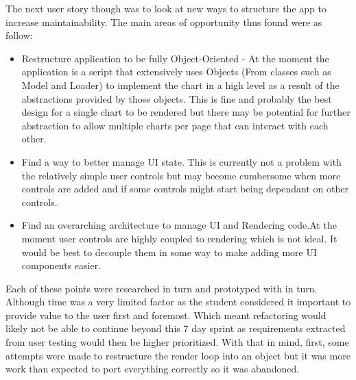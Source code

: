 The next user story though was to look at new ways to structure the app to increase maintainability. The main areas of opportunity thus found were as follow:
\begin{itemize}
    \item Restructure application to be fully Object-Oriented - At the moment the application is a script that extensively uses Objects (From classes such as Model and Loader) to implement the chart in a high level as a result of the abstractions provided by those objects. This is fine and probably the best design for a single chart to be rendered but there may be potential for further abstraction to allow multiple charts per page that can interact with each other.
    \item Find a way to better manage UI state. This is currently not a problem with the relatively simple user controls but may become cumbersome when more controls are added and if some controls might start being dependant on other controls.
    \item Find an overarching architecture to manage UI and Rendering code.At the moment user controls are highly coupled to rendering which is not ideal. It would be best to decouple them in some way to make adding more UI components easier.
\end{itemize}

Each of these points were researched in turn and prototyped with in turn. Although time was a very limited factor as the student considered it important to provide value to the user first and foremost. Which meant refactoring would likely not be able to continue beyond this 7 day sprint as requirements extracted from user testing would then be higher prioritized. With that in mind, first, some attempts were made to restructure the render loop into an object but it was more work than expected to port everything correctly so it was abandoned.

